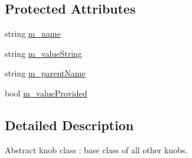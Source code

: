 \subsection*{Protected Attributes}
\begin{DoxyCompactItemize}
\item 
string \hyperlink{classabstract__knob__c_a706239ddb3144e45278c2285e129ba84}{m\_\-name}
\item 
string \hyperlink{classabstract__knob__c_a9a877666f9147d4f7cce24a410fb04a2}{m\_\-valueString}
\item 
string \hyperlink{classabstract__knob__c_a35408499c80112fa114354a1fc2e892d}{m\_\-parentName}
\item 
bool \hyperlink{classabstract__knob__c_a80ab5654d985a3f6b0c452575975e257}{m\_\-valueProvided}
\end{DoxyCompactItemize}


\subsection{Detailed Description}
Abstract knob class : base class of all other knobs. 

